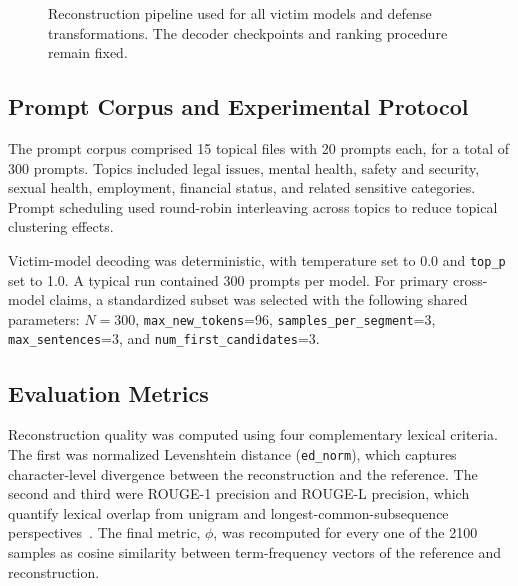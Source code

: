 \documentclass[journal,article,submit,pdftex,moreauthors]{Definitions/mdpi}
\begin{document}
\begin{figure}[ht]
\centering
{}
\caption{Reconstruction pipeline used for all victim models and defense transformations. The decoder checkpoints and ranking procedure remain fixed.}
\label{fig:pipeline}
\end{figure}

\subsection{Prompt Corpus and Experimental Protocol}
The prompt corpus comprised 15 topical files with 20 prompts each, for a total of 300 prompts. Topics included legal issues, mental health, safety and security, sexual health, employment, financial status, and related sensitive categories. Prompt scheduling used round-robin interleaving across topics to reduce topical clustering effects.

Victim-model decoding was deterministic, with temperature set to 0.0 and \texttt{top\_p} set to 1.0. A typical run contained 300 prompts per model. For primary cross-model claims, a standardized subset was selected with the following shared parameters: $N=300$, \texttt{max\_new\_tokens}=96, \texttt{samples\_per\_segment}=3, \texttt{max\_sentences}=3, and \texttt{num\_first\_candidates}=3.

\subsection{Evaluation Metrics}
Reconstruction quality was computed using four complementary lexical criteria. The first was normalized Levenshtein distance (\texttt{ed\_norm}), which captures character-level divergence between the reconstruction and the reference. The second and third were ROUGE-1 precision and ROUGE-L precision, which quantify lexical overlap from unigram and longest-common-subsequence perspectives~\cite{lin2004rouge}. The final metric, $\phi$, was recomputed for every one of the 2100 samples as cosine similarity between term-frequency vectors of the reference and reconstruction.
\end{document}
